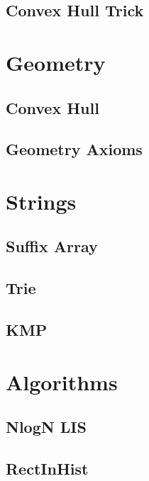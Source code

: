 \documentclass[twocolumn]{article}
\begin{document}
        \subsection{Convex Hull Trick}
        

    \newpage
    \section{Geometry}
        \subsection{Convex Hull}
        
        \subsection{Geometry Axioms}
        

    \newpage
    \section{Strings}
        \subsection{Suffix Array}
        
        \subsection{Trie}
        
        \subsection{KMP}
        


    \newpage
    \section{Algorithms}
        \subsection{NlogN LIS}
        
        \subsection{RectInHist}
        
\end{document}
